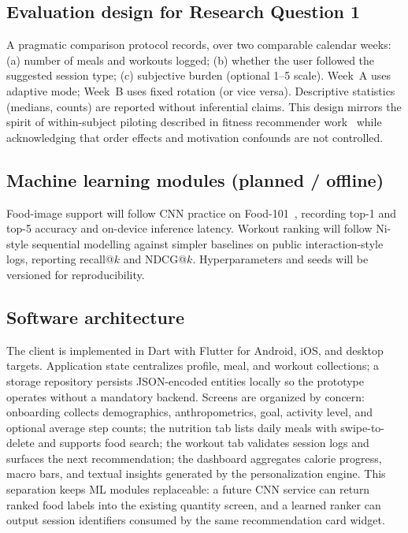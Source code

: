 \documentclass[conference]{IEEEtran}
\begin{document}
\subsection{Evaluation design for Research Question 1}
A pragmatic comparison protocol records, over two comparable calendar weeks: (a) number of meals and workouts logged; (b) whether the user followed the suggested session type; (c) subjective burden (optional 1--5 scale). Week~A uses adaptive mode; Week~B uses fixed rotation (or vice versa). Descriptive statistics (medians, counts) are reported without inferential claims. This design mirrors the spirit of within-subject piloting described in fitness recommender work~\cite{ni2019modeling} while acknowledging that order effects and motivation confounds are not controlled.

\subsection{Machine learning modules (planned / offline)}
Food-image support will follow CNN practice on Food-101~\cite{bossard2014food,liu2016deepfood}, recording top-1 and top-5 accuracy and on-device inference latency. Workout ranking will follow Ni-style sequential modelling against simpler baselines on public interaction-style logs, reporting recall@$k$ and NDCG@$k$. Hyperparameters and seeds will be versioned for reproducibility.

\subsection{Software architecture}
The client is implemented in Dart with Flutter for Android, iOS, and desktop targets. Application state centralizes profile, meal, and workout collections; a storage repository persists JSON-encoded entities locally so the prototype operates without a mandatory backend. Screens are organized by concern: onboarding collects demographics, anthropometrics, goal, activity level, and optional average step counts; the nutrition tab lists daily meals with swipe-to-delete and supports food search; the workout tab validates session logs and surfaces the next recommendation; the dashboard aggregates calorie progress, macro bars, and textual insights generated by the personalization engine. This separation keeps ML modules replaceable: a future CNN service can return ranked food labels into the existing quantity screen, and a learned ranker can output session identifiers consumed by the same recommendation card widget.
\end{document}
